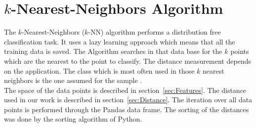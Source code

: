 \section{$k$-Nearest-Neighbors Algorithm}
\label{sec:TheoryKnn}
The $k$-Nearest-Neighbors ($k$-NN) algorithm performs a distribution free classification task. It uses a lazy learning approach which means that all the training data is saved. The Algorithm searches in that data base for the $k$ points which are the nearest to the point to classify. The distance measurement depends on the application. The class which is most often used in those $k$ nearest neighbors is the one assumed for the sample \cite[p.~338~f.]{bib:Alzate2007}.\\
The space of the data points is described in section~\ref{sec:Features}. The distance used in our work is described in section~\ref{sec:Distance}. The iteration over all data points is performed through the Pandas data frame. The sorting of the distances was done by the sorting algorithm of Python.
